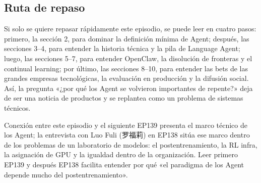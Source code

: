 \subsection{Ruta de repaso}

Si solo se quiere repasar rápidamente este episodio, se puede leer en cuatro pasos: primero, la sección 2, para dominar la definición mínima de Agent; después, las secciones 3--4, para entender la historia técnica y la pila de Language Agent; luego, las secciones 5--7, para entender OpenClaw, la disolución de fronteras y el continual learning; por último, las secciones 8--10, para entender las bets de las grandes empresas tecnológicas, la evaluación en producción y la difusión social. Así, la pregunta «¿por qué los Agent se volvieron importantes de repente?» deja de ser una noticia de productos y se replantea como un problema de sistemas técnicos.

\begin{knowledgebox}{Conexión entre este episodio y el siguiente}
EP139 presenta el marco técnico de los Agent; la entrevista con Luo Fuli (罗福莉) en EP138 sitúa ese marco dentro de los problemas de un laboratorio de modelos: el postentrenamiento, la RL infra, la asignación de GPU y la igualdad dentro de la organización. Leer primero EP139 y después EP138 facilita entender por qué «el paradigma de los Agent depende mucho del postentrenamiento».
\end{knowledgebox}

